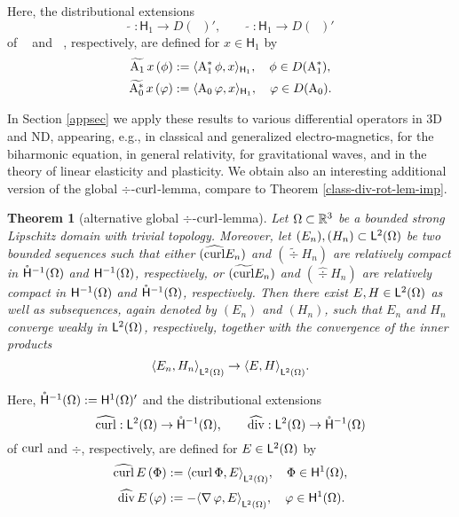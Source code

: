 \documentclass[a4paper]{amsart}
\newcommand{\hmoc}{\mathring\hsymbol^{-1}}
\newcommand{\hmocom}{\hmoc(\om)}
\renewcommand{\H}{\mathsf{H}}
\DeclareMathOperator{\Az}{A_{0}}
\DeclareMathOperator{\Azs}{A_{0}^{*}}
\DeclareMathOperator{\Ao}{A_{1}}
\DeclareMathOperator{\Aos}{A_{1}^{*}}
\newtheorem{theorom}{Theorem}
\begin{document}
Here, the distributional extensions 
$$\widetilde{\Ao}:\H_{1}\to D(\Aos)',\qquad
\widetilde{\Azs}:\H_{1}\to D(\Az)'$$
of $\Ao$ and $\Azs$, respectively, are defined for $x\in\H_{1}$ by
\begin{align*}
\widetilde{\Ao}\,x\,(\phi)&:=\scp{\Aos\phi}{x}_{\H_{1}},\quad
\phi\in D(\Aos),\\
\widetilde{\Azs}\,x\,(\varphi)&:=\scp{\Az\varphi}{x}_{\H_{1}},\quad
\varphi\in D(\Az).
\end{align*}

In Section \ref{appsec} we apply these results to various differential operators in 3D and ND,
appearing, e.g., in classical and generalized electro-magnetics, for the biharmonic equation,
in general relativity, for gravitational waves, and in the theory 
of linear elasticity and plasticity.
We obtain also an interesting additional version of the 
global $\div$-$\operatorname{curl}$-lemma, compare to Theorem \ref{class-div-rot-lem-imp}.

\begin{theorom}[alternative global $\div$-$\operatorname{curl}$-lemma]
Let $\Omega\subset\mathbb{R}^{3}$ be a bounded strong Lipschitz domain with trivial topology.
Moreover, let $(E_{n}),(H_{n})\subset\overset{}{\mathsf{L}}{}^{2}_{}(\Omega)$ be two bounded sequences such that either
$(\widehat{\operatorname{curl}}E_{n})$ and $(\widetilde{\div}H_{n})$ are relatively compact in $\hmocom$ and $\overset{}{\mathsf{H}}{}^{-1}_{}(\Omega)$, respectively,
or $(\widetilde{\operatorname{curl}}E_{n})$ and $(\widehat{\div}H_{n})$ are relatively compact in $\overset{}{\mathsf{H}}{}^{-1}_{}(\Omega)$ and $\hmocom$, respectively.
Then there exist $E,H\in\overset{}{\mathsf{L}}{}^{2}_{}(\Omega)$ as well as subsequences, again denoted by $(E_{n})$ and $(H_{n})$, 
such that $E_{n}$ and $H_{n}$ converge weakly in $\overset{}{\mathsf{L}}{}^{2}_{}(\Omega)$, respectively, 
together with the convergence of the inner products
$$\langle E_{n},H_{n}\rangle_{\overset{}{\mathsf{L}}{}^{2}_{}(\Omega)}\to\langle E,H\rangle_{\overset{}{\mathsf{L}}{}^{2}_{}(\Omega)}.$$
\end{theorom}

Here, $\hmocom:=\hoom'$ and the distributional extensions 
$$\widehat{\curl}:\ltom\to\hmocom,\qquad
\widehat{\div}:\ltom\to\hmocom$$
of $\operatorname{curl}$ and $\div$, respectively, are defined for $E\in\overset{}{\mathsf{L}}{}^{2}_{}(\Omega)$ by
\begin{align*}
\widehat{\operatorname{curl}}\,E\,(\Phi)&:=\langle\operatorname{curl}\Phi,E\rangle_{\overset{}{\mathsf{L}}{}^{2}_{}(\Omega)},\quad
\Phi\in\overset{}{\mathsf{H}}{}^{1}_{}(\Omega),\\
\widehat{\operatorname{div}}\,E\,(\varphi)&:=-\langle\operatorname{\nabla}\varphi,E\rangle_{\overset{}{\mathsf{L}}{}^{2}_{}(\Omega)},\quad
\varphi\in\overset{}{\mathsf{H}}{}^{1}_{}(\Omega).
\end{align*}
\end{document}
